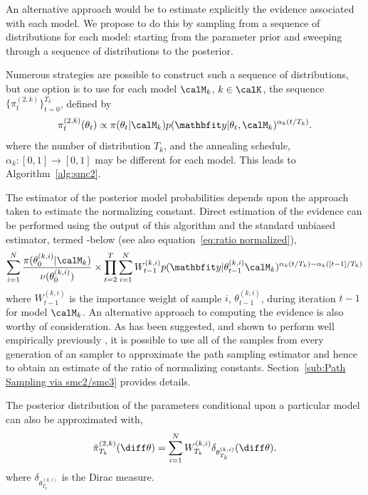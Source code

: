 An alternative approach would be to estimate explicitly the evidence
associated with each model. We propose to do this by sampling from a sequence
of distributions for each model: starting from the parameter prior and
sweeping through a sequence of distributions to the posterior.

Numerous strategies are possible to construct such a sequence of
distributions, but one option is to use for each model $\calM_k$, $k\in\calK$,
the sequence $\{\pi_t^{(2,k)}\}_{t=0}^{T_k}$, defined by
\begin{equation}
  \pi_t^{(2,k)}(\theta_t) \propto
  \pi(\theta_t|\calM_k)p(\data|\theta_t,\calM_k)^{\alpha_k(t/T_k)}.
  \label{eq:geometry_2}
\end{equation}
where the number of distribution $T_k$, and the annealing schedule,
$\alpha_k:[0,1]\to[0,1]$ may be different for each model. This leads to
Algorithm~\ref{alg:smc2}.

The estimator of the posterior model probabilities depends upon the approach
taken to estimate the normalizing constant. Direct estimation of the evidence
can be performed using the output of this \smc algorithm and the standard
unbiased estimator, termed \smc[2]-\ds below (see also
equation~\eqref{eq:ratio normalized}),
\begin{equation}\label{eq:smc2-ds}
  \sum_{i=1}^N \frac{\pi(\theta_0^{(k,i)}|\calM_k)}{\nu(\theta_0^{(k,i)})}
  \times \prod_{t=2}^T \sum_{i=1}^N W_{t-1}^{(k,i)}
  p(\data|\theta_{t-1}^{(k,i)}\calM_k)^{\alpha_k(t/T_k) - \alpha_k([t-1]/T_k)}
\end{equation}
where $W_{t-1}^{(k,i)}$ is the importance weight of sample $i$,
$\theta_{t-1}^{(k,i)}$, during iteration $t-1$ for model $\calM_k$. An
alternative approach to computing the evidence is also worthy of
consideration. As has been suggested, and shown to perform well empirically
previously \cite[see, for example]{Johansen:2006wm}, it is possible to use all
of the samples from every generation of an \smc sampler to approximate the
path sampling estimator and hence to obtain an estimate of the ratio of
normalizing constants. Section~\ref{sub:Path Sampling via smc2/smc3} provides
details.

The posterior distribution of the parameters conditional upon a particular
model can also be approximated with,
\begin{equation*}
  \hat{\pi}_{T_k}^{(2,k)}(\diff\theta) =
  \sum\limits_{i=1}^{N} W_{T_k}^{(k,i)}
  \delta_{\theta^{(k,i)}_{T_k}}(\diff\theta).
\end{equation*}
where $\delta_{\theta^{(k,i)}_{T_k}}$ is the Dirac measure.

